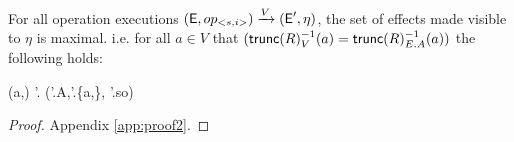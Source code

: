 %
%
\begin{theorem}
\label{theorem:two}
For all operation executions 
{\scriptsize $
({\normalfont \textsf{E}},op_{<s,i>}) 
    \xrightarrow{V}
  ({\normalfont \textsf{E}}',\eta) 
$},
the set of effects made visible to $\eta$ is maximal. i.e. for all
 {\scriptsize $a \in V$} that {\scriptsize $(\trunc{R}^{-1}_V(a) =
 \trunc{R}^{-1}_{E.A}(a))$} the
 following holds:
\begin{fmathpar}
(a,\eta) \not\in \E'.\visZ \Rightarrow 
(\E'.A,\E'.\visZ \cup \{a,\eta\}, \E'.so) \not\models \psi[\eta/\hat{\eta}]
\end{fmathpar}
\end{theorem}


\begin{proof}
Appendix \ref{app:proof2}. 
\end{proof}



